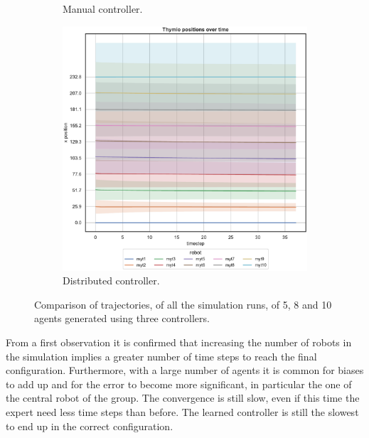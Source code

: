 \begin{figure}[!htb]
\begin{center}
\begin{subfigure}[h]{0.325\textwidth}
		\caption{Manual controller.}
	\end{subfigure}
	\hfill
	\begin{subfigure}[h]{0.325\textwidth}
		\centering
		\includegraphics[width=\textwidth]{contents/images/net-d18/N10/position-overtime-distributed}
		\caption{Distributed controller.}
	\end{subfigure}
\end{center}
\vspace{-0.5cm}
	\caption[Trajectories learned by \texttt{net-d18} using 5, 8 and 10 
	agents.]{Comparison of trajectories, of all the simulation runs, of 5, 8 and 10 
	agents generated using three controllers.}
	\label{fig:net-d18traj10}
\end{figure}
From a first observation it is confirmed that increasing the number of robots in 
the simulation implies a greater number of time steps to reach the final 
configuration.
Furthermore, with a large number of agents it is common for biases to add up 
and for the error to become more significant, in particular the one of the central 
robot of the group.
The convergence is still slow, even if this time the expert need less time steps than 
before. 
The learned controller is still the slowest to end up in the correct configuration.


